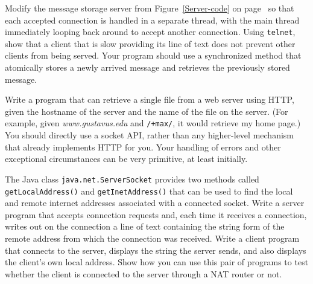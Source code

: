 \begin{chapterEnumerate}
\item
\label{multithreaded-server-project}
Modify the message storage server from Figure~\ref{Server-code} on
page~\pageref{Server-code} so
that each accepted connection is handled in a separate thread, with
the main thread immediately looping back around to accept another
connection.  Using \verb|telnet|, show that a client that is slow
providing its line of text does not prevent other clients from being
served.  Your program should use a synchronized method that atomically stores a
newly arrived message and retrieves the previously stored message.
\item
Write a program that can retrieve a single file from a web server
using HTTP, given the hostname of the server and the name of the
file on the server. (For example, given \textit{www.gustavus.edu} and
\verb|/+max/|, it would retrieve my home page.)  You should directly
use a socket API, rather than any higher-level mechanism that already
implements HTTP for you.  Your handling of errors and other
exceptional circumstances can be very primitive, at least initially.
\item
The Java class {\tt java.net.ServerSocket} provides two methods called {\tt
  getLocalAddress()} and {\tt getInetAddress()} that can be used to
  find the local and remote internet addresses associated with a
  connected socket.  Write a server program that accepts connection
  requests and, each time it receives a connection, writes out on the
  connection a line of text containing the string form of the remote
  address from which the connection was received.  Write a client
  program that connects to the server, displays the string the server
  sends, and also displays the client's own local address.  Show how
  you can use this pair of programs to test whether the client is
  connected to the server through a NAT router or not.
\end{chapterEnumerate}

